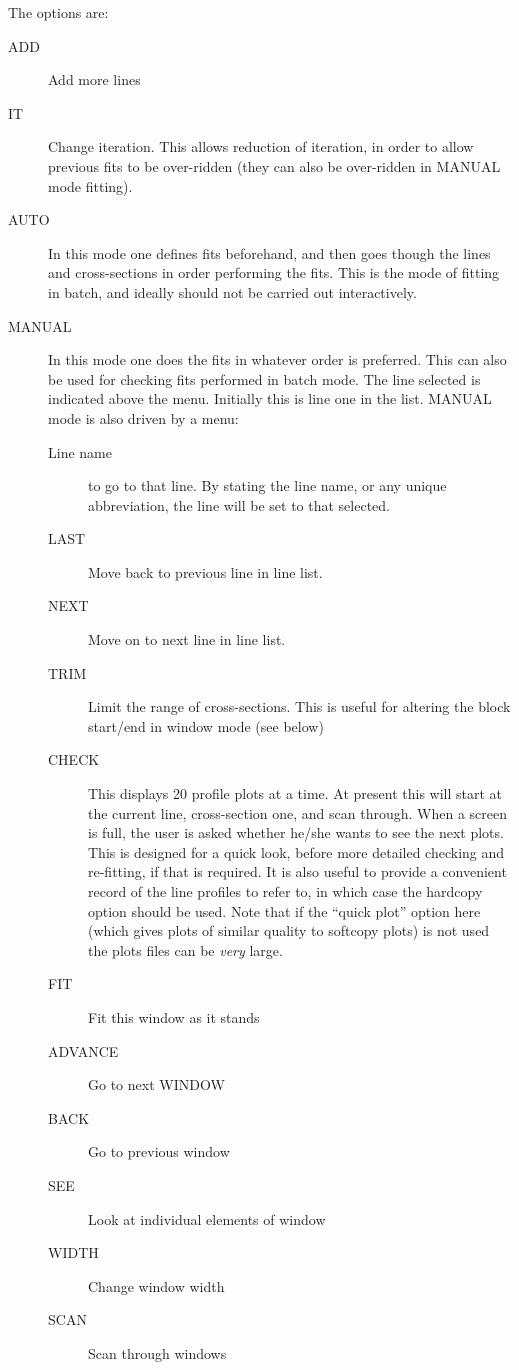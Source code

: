 The options are:
\begin{description}
\item[ADD] Add more lines
\item[IT] Change iteration.
This allows reduction of iteration, in order to allow previous fits to
be over-ridden (they can also be over-ridden in MANUAL mode fitting). 
\item[AUTO] In this mode one defines fits beforehand, and then goes
though the lines and cross-sections in order performing the fits.
This is the mode of fitting in batch, and ideally should not be carried
out interactively.
\item[MANUAL] In this mode one does the fits in whatever order is
preferred.
This can also be used for checking fits performed in batch mode.
The line selected is indicated above the menu.
Initially this is line one in the list.
MANUAL mode is also driven by a menu:
\begin{description}
\item[Line name] to go to that line.
By stating the line name, or any unique abbreviation, the line will be
set to that selected.
\item[LAST] Move back to previous line in line list.
\item[NEXT] Move on to next line in line list.
\item[TRIM] Limit the range of cross-sections.
This is useful for altering the block start/end in window mode (see
below)
\item[CHECK] This displays 20 profile plots at a time.
At present this will start at the current line, cross-section one, and
scan through.
When a screen is full, the user is asked whether he/she wants to see the
next plots.
This is designed for a quick look, before more detailed checking and
re-fitting, if that is required.
It is also useful to provide a convenient record of the line profiles to
refer to, in which case the hardcopy option should be used. Note that
if the ``quick plot'' option here (which gives plots of similar quality
to softcopy plots) is not used the plots files can be {\em very} large.
\item[FIT] Fit this window as it stands
\item[ADVANCE] Go to next WINDOW
\item[BACK] Go to previous window
\item[SEE] Look at individual elements of window
\item[WIDTH] Change window width
\item[SCAN] Scan through windows

\end{description}
\end{description}
